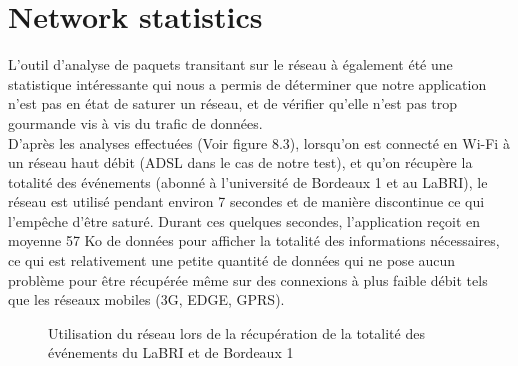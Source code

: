 \begin{figure}[h!]
  \label{fig:with_pool}
  \center
  \setlength\fboxsep{5pt}
  \setlength\fboxrule{0.5pt}
\end{figure}

\newpage

\section{Network statistics}
L’outil d’analyse de paquets transitant sur le réseau à également été une statistique intéressante qui nous a permis de déterminer que notre application n’est pas en état de saturer un réseau, et de vérifier qu’elle n’est pas trop gourmande vis à vis du trafic de données.\\
D’après les analyses effectuées (Voir figure 8.3), lorsqu’on est connecté en Wi-Fi à un réseau haut débit (ADSL dans le cas de notre test), et qu’on récupère la totalité des événements (abonné à l'université de Bordeaux 1 et au LaBRI), le réseau est utilisé pendant environ 7 secondes et de manière discontinue ce qui l’empêche d’être saturé. Durant ces quelques secondes, l’application reçoit en moyenne 57 Ko de données pour afficher la totalité des informations nécessaires, ce qui est relativement une petite quantité de données qui ne pose aucun problème pour être récupérée même sur des connexions à plus faible débit tels que les réseaux mobiles (3G, EDGE, GPRS). 

\begin{figure}[h!]
  \label{fig:network_statistics_events}
  \center
  \setlength\fboxsep{5pt}
  \setlength\fboxrule{0.5pt}
  \caption{Utilisation du réseau lors de la récupération de la totalité des événements du LaBRI et de Bordeaux 1}
\end{figure}

